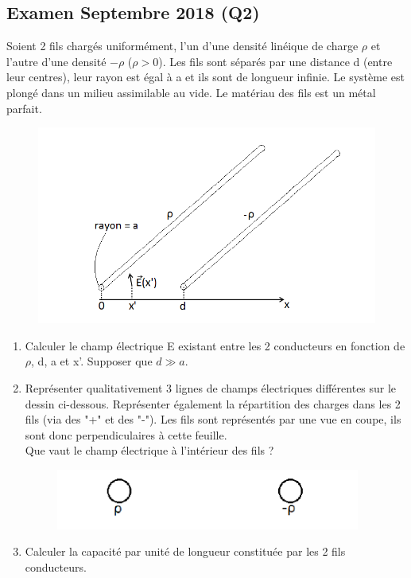 \newpage
\subsection{Examen Septembre 2018 (Q2)}
Soient 2 fils chargés uniformément, l’un d’une densité linéique de charge $\rho$ et l’autre d’une densité $-\rho$ ($\rho > 0$). Les fils sont séparés par une distance d (entre leur centres), leur rayon est égal à a et ils sont de longueur infinie. Le système est plongé dans un milieu assimilable au vide. 
Le matériau des fils est un métal parfait.
\begin{figure}[h!]
    \centering
    \includegraphics[width = 15cm]{TpQEx_Champs/Q2_TheoChampsSept2018.PNG}
    \label{fig:Q2_TheoChampsSept2018}
\end{figure}

\begin{enumerate}
    \item Calculer le champ électrique E existant entre les 2 conducteurs en fonction de $\rho$, d, a et x’. Supposer que $d \gg a$.
    \item Représenter qualitativement 3 lignes de champs électriques différentes sur le dessin ci-dessous. Représenter également la répartition des charges dans les 2 fils (via des "+" et des "-"). Les fils sont représentés par une vue en coupe, ils sont donc perpendiculaires à cette feuille.\\
    
    Que vaut le champ électrique à l’intérieur des fils ? 
    \begin{figure}[h!]
        \centering
        \includegraphics[width = 10cm]{TpQEx_Champs/Q2_Hint_TheoChampsSept2018.PNG}
        \label{fig:Q2_Hint_TheoChampsSept2018}
    \end{figure}
    \item Calculer la capacité par unité de longueur constituée par les 2 fils conducteurs.
\end{enumerate}

